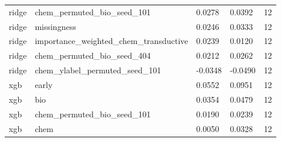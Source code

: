 \begin{tabular}{lllll}
ridge & chem\_permuted\_bio\_seed\_101 & 0.0278 & 0.0392 & 12 \\
ridge & missingness & 0.0246 & 0.0333 & 12 \\
ridge & importance\_weighted\_chem\_transductive & 0.0239 & 0.0120 & 12 \\
ridge & chem\_permuted\_bio\_seed\_404 & 0.0212 & 0.0262 & 12 \\
ridge & chem\_ylabel\_permuted\_seed\_101 & -0.0348 & -0.0490 & 12 \\
xgb & early & 0.0552 & 0.0951 & 12 \\
xgb & bio & 0.0354 & 0.0479 & 12 \\
xgb & chem\_permuted\_bio\_seed\_101 & 0.0190 & 0.0239 & 12 \\
xgb & chem & 0.0050 & 0.0328 & 12 \\
\hline
\end{tabular}
